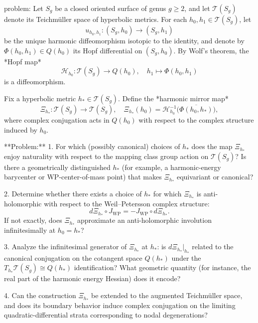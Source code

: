 problem:  
Let \(S_g\) be a closed oriented surface of genus \(g\ge2\), and let \(\mathcal{T}(S_g)\) denote its Teichmüller space of hyperbolic metrics.  
For each \(h_0,h_1\in\mathcal{T}(S_g)\), let  
\[
u_{h_0,h_1}:(S_g,h_0)\to(S_g,h_1)
\]
be the unique harmonic diffeomorphism isotopic to the identity, and denote by \(\Phi(h_0,h_1)\in Q(h_0)\) its Hopf differential on \((S_g,h_0)\).  
By Wolf’s theorem, the *Hopf map*
\[
\mathcal{H}_{h_0}:\mathcal{T}(S_g)\to Q(h_0),\quad h_1\mapsto \Phi(h_0,h_1)
\]
is a diffeomorphism.  

Fix a hyperbolic metric \(h_*\in \mathcal{T}(S_g)\).  
Define the *harmonic mirror map*
\[
\Xi_{h_*}:\mathcal{T}(S_g)\to\mathcal{T}(S_g),\quad 
\Xi_{h_*}(h_0)=\mathcal{H}_{h_0}^{-1}\big(\overline{\Phi(h_0,h_*)}\big),
\]
where complex conjugation acts in \(Q(h_0)\) with respect to the complex structure induced by \(h_0\).

**Problem:**  
1. For which (possibly canonical) choices of \(h_*\) does the map \(\Xi_{h_*}\) enjoy naturality with respect to the mapping class group action on \(\mathcal{T}(S_g)\)?  
   Is there a geometrically distinguished \(h_*\) (for example, a harmonic-energy barycenter or WP-center-of-mass point) that makes \(\Xi_{h_*}\) equivariant or canonical?  

2. Determine whether there exists a choice of \(h_*\) for which \(\Xi_{h_*}\) is anti-holomorphic with respect to the Weil–Petersson complex structure:
   \[
   d\Xi_{h_*}\circ J_{\mathrm{WP}} = -J_{\mathrm{WP}}\circ d\Xi_{h_*}.
   \]
   If not exactly, does \(\Xi_{h_*}\) approximate an anti-holomorphic involution infinitesimally at \(h_0=h_*\)?  

3. Analyze the infinitesimal generator of \(\Xi_{h_*}\) at \(h_*\): is \(d\Xi_{h_*}|_{h_*}\) related to the canonical conjugation on the cotangent space \(Q(h_*)\) under the \(T_{h_*}\mathcal{T}(S_g)\cong Q(h_*)\) identification?  What geometric quantity (for instance, the real part of the harmonic energy Hessian) does it encode?  

4. Can the construction \(\Xi_{h_*}\) be extended to the augmented Teichmüller space, and does its boundary behavior induce complex conjugation on the limiting quadratic-differential strata corresponding to nodal degenerations?  

